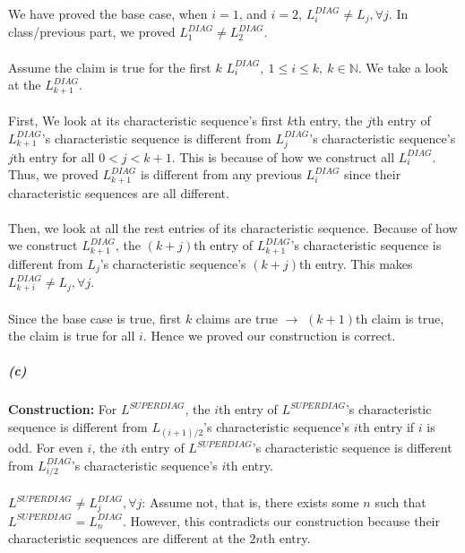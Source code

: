 \documentclass[12pt]{article}
\theoremstyle{definition}
\numberwithin{equation}{section}
\begin{document}
We have proved the base case, when $i=1$, and $i=2$, $L^{DIAG}_i \neq L_j,\forall j$. In class/previous part, we proved $L^{DIAG}_1 \neq L^{DIAG}_2$. \\~\\

Assume the claim is true for the first $k$ $L^{DIAG}_i,\ 1\leq i \leq k,\ k \in \mathbb{N}$. We take a look at the $L^{DIAG}_{k+1}$. \\~\\

First, We look at its characteristic sequence's first $k$th entry, the $j$th entry of $L^{DIAG}_{k+1}$'s characteristic sequence is different from $L^{DIAG}_j$'s characteristic sequence's $j$th entry for all $0 < j < k+1$. This is because of how we construct all $L^{DIAG}_i$. Thus, we proved $L^{DIAG}_{k+1}$ is different from any previous $L^{DIAG}_i$ since their characteristic sequences are all different.\\~\\ 

Then, we look at all the rest entries of its characteristic sequence. Because of how we construct $L^{DIAG}_{k+1}$, the $(k+j)$th entry of $L^{DIAG}_{k+1}$'s characteristic sequence is different from $L_j$'s characteristic sequence's $(k+j)$th entry. This makes $L^{DIAG}_{k+i} \neq L_j,\forall j$. \\~\\

Since the base case is true, first $k$ claims are true $\rightarrow$ $(k+1)$th claim is true, the claim is true for all $i$. Hence we proved our construction is correct.

\newpage

\subparagraph{(c)} 
\textbf{Construction:} For $L^{SUPERDIAG}$, the $i$th entry of $L^{SUPERDIAG}$'s characteristic sequence is different from $L_{(i+1)/2}$'s characteristic sequence's $i$th entry if $i$ is odd. For even $i$, the $i$th entry of $L^{SUPERDIAG}$'s characteristic sequence is different from $L^{DIAG}_{i/2}$'s characteristic sequence's $i$th entry. \\~\\

$L^{SUPERDIAG} \neq L^{DIAG}_j,\forall j$: Assume not, that is, there exists some $n$ such that $L^{SUPERDIAG} = L^{DIAG}_n$. However, this contradicts our construction because their characteristic sequences are different at the $2n$th entry. \\~\\
\end{document}

